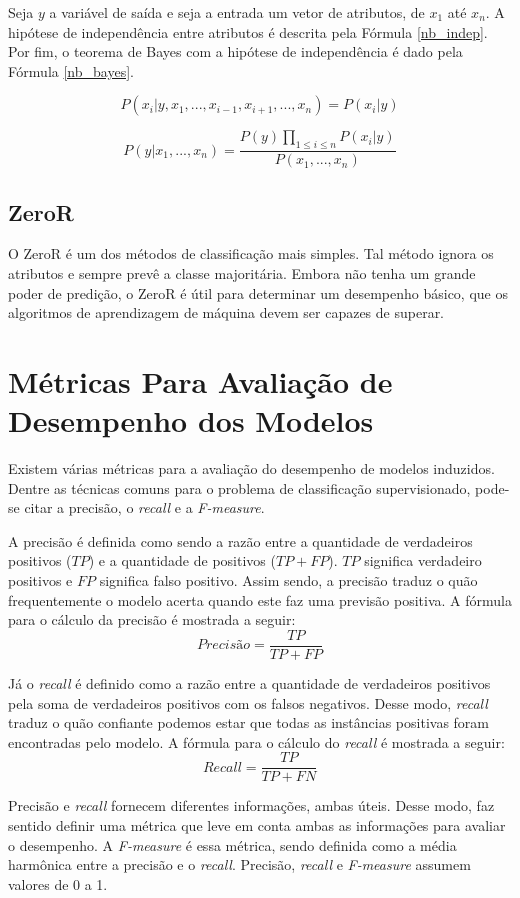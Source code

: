 Seja $y$ a variável de saída e seja a entrada um vetor de atributos, de $x_1$ até
$x_n$. A hipótese de independência entre atributos é descrita pela Fórmula \ref{nb_indep}.
Por fim, o teorema de Bayes com a hipótese de independência é dado pela Fórmula
\ref{nb_bayes}.  

\begin{equation}
    \label{nb_indep}
    P(x_i |y, x_1, ..., x_{i-1}, x_{i+1}, ..., x_n) = P(x_i | y)
\end{equation}

\begin{equation}
    \label{nb_bayes}
    P(y | x_1, ..., x_n) = \frac{P(y)\prod_{1 \le i \le n} P(x_i|y)}{P(x_1, ..., x_n)}
\end{equation}


\subsection{ZeroR}
O ZeroR é um dos métodos de classificação mais simples. Tal método ignora os
atributos e sempre prevê a classe majoritária. Embora não tenha um grande poder de
predição, o ZeroR é útil para determinar um desempenho básico, que os algoritmos de
aprendizagem de máquina devem ser capazes de superar. 

\section{Métricas Para Avaliação de Desempenho dos Modelos}
Existem várias métricas para a avaliação do desempenho de modelos induzidos. Dentre
as técnicas comuns para o problema de classificação supervisionado, pode-se citar a
precisão, o \textit{recall} e a \textit{F-measure}.  

\par A precisão é definida como sendo a razão entre a quantidade de verdadeiros
positivos ($TP$) e a quantidade de positivos ($TP + FP$). $TP$ significa verdadeiro
positivos e $FP$ significa falso positivo. Assim sendo, a precisão traduz o quão
frequentemente o modelo acerta quando este faz uma previsão positiva.  A fórmula para
o cálculo da precisão é mostrada a seguir: 
\begin{equation}
    Precisão = \frac{TP}{TP + FP}
\end{equation}

Já o \textit{recall} é definido como a razão entre a quantidade de verdadeiros
positivos pela soma de verdadeiros positivos com os falsos negativos. Desse modo,
\textit{recall} traduz o quão confiante podemos estar que todas as instâncias
positivas foram encontradas pelo modelo. A fórmula para o cálculo do \textit{recall} é
mostrada a seguir: 
\begin{equation}
    Recall = \frac{TP}{TP + FN}
\end{equation}

\par Precisão e \textit{recall} fornecem diferentes informações, ambas 
úteis. Desse modo, faz sentido definir uma métrica que leve em conta ambas as
informações para avaliar o desempenho. A \textit{F-measure} é essa métrica, sendo
definida como a média harmônica entre a precisão e o \textit{recall}. Precisão,
\textit{recall} e \textit{F-measure} assumem valores de 0 a 1.
